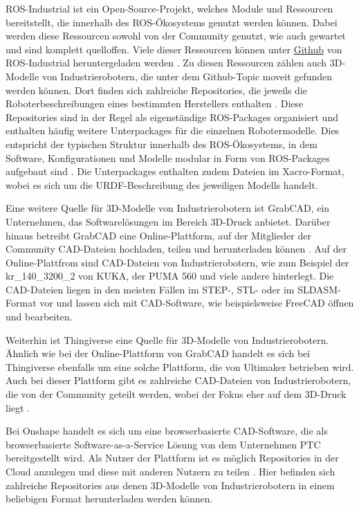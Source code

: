 ROS-Industrial ist ein Open-Source-Projekt, welches Module und Ressourcen bereitstellt, die innerhalb des ROS-Ökosystems genutzt werden können.
Dabei werden diese Ressourcen sowohl von der Community genutzt, wie auch gewartet und sind komplett quelloffen.
Viele dieser Ressourcen können unter \href{https://github.com/ros-industrial}{Github} von ROS-Industrial heruntergeladen werden .
Zu diesen Ressourcen zählen auch 3D-Modelle von Industrierobotern, die unter dem Github-Topic moveit gefunden werden können.
Dort finden sich zahlreiche Repositories,
die jeweils die Roboterbeschreibungen eines bestimmten Herstellers enthalten .
Diese Repositories sind in der Regel als eigenständige ROS-Packages organisiert und enthalten häufig
weitere Unterpackages für die einzelnen Robotermodelle.
Dies entspricht der typischen Struktur innerhalb des ROS-Ökosystems,
in dem Software, Konfigurationen und Modelle modular in Form von ROS-Packages aufgebaut sind .
Die Unterpackages enthalten zudem Dateien im Xacro-Format, wobei es sich um die URDF-Beschreibung des jeweiligen Modells handelt.

Eine weitere Quelle für 3D-Modelle von Industrierobotern ist GrabCAD, ein Unternehmen,
das Softwarelösungen im Bereich 3D-Druck anbietet.
Darüber hinaus betreibt GrabCAD eine Online-Plattform,
auf der Mitglieder der Community CAD-Dateien hochladen, teilen und herunterladen können .
Auf der Online-Plattfrom sind CAD-Dateien von Industrierobotern, wie zum Beispiel der kr\_140\_3200\_2 von KUKA,
der PUMA 560 und viele andere hinterlegt.
Die CAD-Dateien liegen in den meisten Fällen im STEP-, STL- oder im SLDASM-Format vor und lassen sich mit CAD-Software,
wie beispielsweise FreeCAD öffnen und bearbeiten.


Weiterhin ist Thingiverse eine Quelle für 3D-Modelle von Industrierobotern.
Ähnlich wie bei der Online-Plattform von GrabCAD handelt es sich bei Thingiverse
ebenfalls um eine solche Plattform, die von Ultimaker betrieben wird.
Auch bei dieser Plattform gibt es zahlreiche CAD-Dateien von Industrierobotern,
die von der Community geteilt werden, wobei der Fokus eher auf dem 3D-Druck liegt .


Bei Onshape handelt es sich um eine browserbasierte CAD-Software,
die als browserbasierte Software-as-a-Service Lösung von dem Unternehmen PTC bereitgestellt wird.
Als Nutzer der Plattform ist es möglich Repositories in der Cloud anzulegen und diese mit anderen Nutzern zu teilen .
Hier befinden sich zahlreiche Repositories aus denen 3D-Modelle von Industrierobotern in einem beliebigen Format herunterladen werden können.


